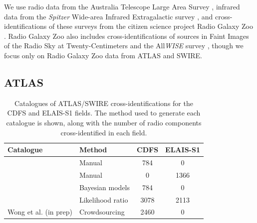\documentclass[fleqn,usenatbib,usedcolumn]{mnras}
\begin{document}
  We use radio data from the Australia Telescope Large Area Survey
  \citep[ATLAS;][]{norris06,franzen15}, infrared data from the \emph{Spitzer}
  Wide-area Infrared Extragalactic survey \citep[SWIRE;][]{lonsdale03swire,
  surace05swire}, and cross-identifications of these surveys from the citizen
  science project Radio Galaxy Zoo \citep{banfield15}. Radio Galaxy Zoo also
  includes cross-identifications of sources in Faint Images of the Radio Sky at
  Twenty-Centimeters \citep[FIRST;][]{white97first} and the All\emph{WISE}
  survey \citep{cutri2013wiseexplanatory}, though we focus only on Radio
  Galaxy Zoo data from ATLAS and SWIRE.

  \subsection{ATLAS}\label{sec:atlas}
    \begin{table}
      \caption{Catalogues of ATLAS/SWIRE cross-identifications for the CDFS
        and ELAIS-S1 fields. The method used to generate each catalogue is
        shown, along with the number of radio components cross-identified in each
        field.}
      \label{tab:atlas-cids}
      \begin{tabular}{llcc}
        \hline
        Catalogue & Method & CDFS & ELAIS-S1\\
        \hline
        \citet{norris06} & Manual & 784 & 0\\
        \citet{middelberg08} & Manual & 0 & 1366\\
        \citet{fan15} & Bayesian models & 784 & 0\\
        \citet{weston18lrpy} & Likelihood ratio & 3078 & 2113\\
        Wong et al. (in prep) & Crowdsourcing & 2460 & 0 \\
        \hline
      \end{tabular}
    \end{table}
\end{document}

